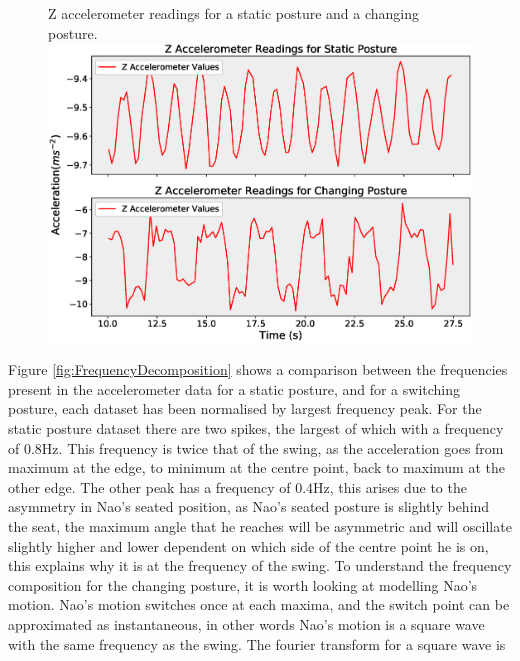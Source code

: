 \documentclass[11pt]{article}
\begin{document}
    \begin{figure}[!htb]
        \centering
        \captionbox
             {Z accelerometer readings for a static posture and a changing posture.\label{fig:AccelerometerComparison}}
             {\includegraphics[width=1.0\textwidth]{AccelerometerComparison.eps}}
    \end{figure}

Figure \ref{fig:FrequencyDecomposition} shows a comparison between the frequencies present in the accelerometer data for a static posture, and for a switching posture, each dataset has been normalised by largest frequency peak. For the static posture dataset there are two spikes, the largest of which with a frequency of $0.8$Hz. This frequency is twice that of the swing, as the acceleration goes from maximum at the edge, to minimum at the centre point, back to maximum at the other edge. The other peak has a frequency of $0.4$Hz, this arises due to the asymmetry in Nao's seated position, as Nao's seated posture is slightly behind the seat, the maximum angle that he reaches will be asymmetric and will oscillate slightly higher and lower dependent on which side of the centre point he is on, this explains why it is at the frequency of the swing. To understand the frequency composition for the changing posture, it is worth looking at modelling Nao's motion. Nao's motion switches once at each maxima, and the switch point can be approximated as instantaneous, in other words Nao's motion is a square wave with the same frequency as the swing. The fourier transform for a square wave is
\end{document}
